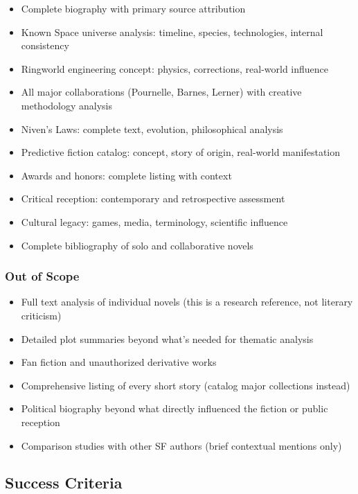 \documentclass[11pt,letterpaper]{article}
\begin{document}
\begin{itemize}[leftmargin=2em]
\item Complete biography with primary source attribution
\item Known Space universe analysis: timeline, species, technologies, internal consistency
\item Ringworld engineering concept: physics, corrections, real-world influence
\item All major collaborations (Pournelle, Barnes, Lerner) with creative methodology analysis
\item Niven's Laws: complete text, evolution, philosophical analysis
\item Predictive fiction catalog: concept, story of origin, real-world manifestation
\item Awards and honors: complete listing with context
\item Critical reception: contemporary and retrospective assessment
\item Cultural legacy: games, media, terminology, scientific influence
\item Complete bibliography of solo and collaborative novels
\end{itemize}

\subsubsection{Out of Scope}

\begin{itemize}[leftmargin=2em]
\item Full text analysis of individual novels (this is a research reference, not literary criticism)
\item Detailed plot summaries beyond what's needed for thematic analysis
\item Fan fiction and unauthorized derivative works
\item Comprehensive listing of every short story (catalog major collections instead)
\item Political biography beyond what directly influenced the fiction or public reception
\item Comparison studies with other SF authors (brief contextual mentions only)
\end{itemize}

\subsection{Success Criteria}
\end{document}
